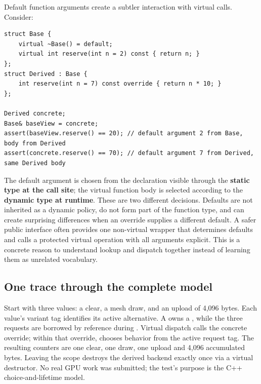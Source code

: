 Default function arguments create a subtler interaction with virtual calls. Consider:

\begin{verbatim}
struct Base {
    virtual ~Base() = default;
    virtual int reserve(int n = 2) const { return n; }
};
struct Derived : Base {
    int reserve(int n = 7) const override { return n * 10; }
};

Derived concrete;
Base& baseView = concrete;
assert(baseView.reserve() == 20); // default argument 2 from Base, body from Derived
assert(concrete.reserve() == 70); // default argument 7 from Derived, same Derived body
\end{verbatim}

The default argument is chosen from the declaration visible through the \textbf{static type at the call site}; the virtual function body is selected according to the \textbf{dynamic type at runtime}. These are two different decisions. Defaults are not inherited as a dynamic policy, do not form part of the function type, and can create surprising differences when an override supplies a different default. A safer public interface often provides one non-virtual wrapper that determines defaults and calls a protected virtual operation with all arguments explicit. This is a concrete reason to understand lookup and dispatch together instead of learning them as unrelated vocabulary.

\subsection{One trace through the complete model}\label{05-engine-i-ch004-one-trace-through-the-complete-model}

\hypertarget{05-engine-i-ch004-one-trace-through-the-complete-model}{}

Start with three  values: a clear, a mesh draw, and an upload of 4,096 bytes. Each value's variant tag identifies its active alternative. A  owns a , while the three requests are borrowed by reference during . Virtual dispatch calls the concrete override; within that override,  chooses behavior from the active request tag. The resulting counters are one clear, one draw, one upload and 4,096 accumulated bytes. Leaving the scope destroys the derived backend exactly once via a virtual destructor. No real GPU work was submitted; the test's purpose is the C++ choice-and-lifetime model.

